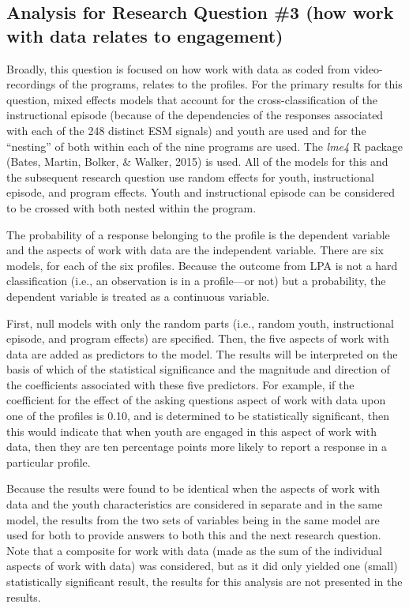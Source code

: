 \documentclass[]{book}
\theoremstyle{definition}
\theoremstyle{definition}
\theoremstyle{definition}
\theoremstyle{remark}
\begin{document}
\subsection{Analysis for Research Question \#3 (how work with data
relates to
engagement)}\label{analysis-for-research-question-3-how-work-with-data-relates-to-engagement}

Broadly, this question is focused on how work with data as coded from
video-recordings of the programs, relates to the profiles. For the
primary results for this question, mixed effects models that account for
the cross-classification of the instructional episode (because of the
dependencies of the responses associated with each of the 248 distinct
ESM signals) and youth are used and for the ``nesting'' of both within
each of the nine programs are used. The \emph{lme4} R package (Bates,
Martin, Bolker, \& Walker, 2015) is used. All of the models for this and
the subsequent research question use random effects for youth,
instructional episode, and program effects. Youth and instructional
episode can be considered to be crossed with both nested within the
program.

The probability of a response belonging to the profile is the dependent
variable and the aspects of work with data are the independent variable.
There are six models, for each of the six profiles. Because the outcome
from LPA is not a hard classification (i.e., an observation is in a
profile---or not) but a probability, the dependent variable is treated
as a continuous variable.

First, null models with only the random parts (i.e., random youth,
instructional episode, and program effects) are specified. Then, the
five aspects of work with data are added as predictors to the model. The
results will be interpreted on the basis of which of the statistical
significance and the magnitude and direction of the coefficients
associated with these five predictors. For example, if the coefficient
for the effect of the asking questions aspect of work with data upon one
of the profiles is 0.10, and is determined to be statistically
significant, then this would indicate that when youth are engaged in
this aspect of work with data, then they are ten percentage points more
likely to report a response in a particular profile.

Because the results were found to be identical when the aspects of work
with data and the youth characteristics are considered in separate and
in the same model, the results from the two sets of variables being in
the same model are used for both to provide answers to both this and the
next research question. Note that a composite for work with data (made
as the sum of the individual aspects of work with data) was considered,
but as it did only yielded one (small) statistically significant result,
the results for this analysis are not presented in the results.
\end{document}
